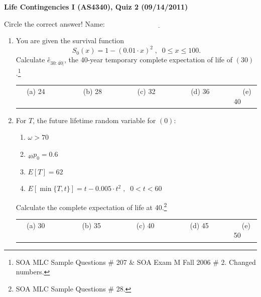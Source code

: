 \documentclass[11pt,fleqn,oneside]{book}
\begin{document}
\thispagestyle{empty}
\setcounter{page}{1}
\begin{center}
{ \large \bf Life Contingencies I (AS4340), Quiz 2 (09/14/2011)}
\end{center}
\noindent
Circle the correct answer! Name: $\underline{\;\;\;\;\;\;\;\;\;\;\;\;\;\;\;\;\;\;\;\;\;\;\;\;\;\;\;\;\;\;\;\;\;\;\;\;\;\;\;\;\;\;\;\;\;\;\;\;\;\;\;\;\;}$
\begin{enumerate}
\item
You are given the survival function
$$
S_0(x) = 1 - (0.01\cdot x)^2\;,\;\;0\leq x \leq 100.
$$
Calculate $\stackrel{\circ}{e}_{30:\overline{40}|}$, the 40-year temporary complete expectation of life of 
$(30)$.\footnote[1]{SOA MLC Sample Questions \# 207 \& SOA Exam M Fall 2006 \# 2. Changed numbers.}

\vspace{0.35cm}
\small
\begin{center}
\begin{tabular}{c c c c c}
(a) 24$\;\;\;\;\;\;\;\;\;\;$ & 
$\;\;\;\;\;\;\;\;\;\;$(b) 28$\;\;\;\;\;\;\;\;\;\;$ & 
$\;\;\;\;\;\;\;\;\;\;$(c) 32$\;\;\;\;\;\;\;\;\;\;$ &
$\;\;\;\;\;\;\;\;\;\;$(d) 36$\;\;\;\;\;\;\;\;\;\;$ &
$\;\;\;\;\;\;\;\;\;\;$(e) 40
\end{tabular}
\end{center}
\vspace{0.2cm}

\normalsize
\item For $T$, the future lifetime random variable for $(0)$:
\begin{enumerate}
\item $\omega > 70$
\item ${_{40}p_0} = 0.6$
\item $E[T] = 62$
\item $E[\min\{T,t\}] = t - 0.005\cdot t^2\;,\;\;0<t<60$
\end{enumerate}
Calculate the complete expectation of life at 40.\footnote[2]{SOA MLC Sample Questions \# 28.}

\vspace{0.35cm}
\small
\begin{center}
\begin{tabular}{c c c c c}
(a) 30$\;\;\;\;\;\;\;\;\;$ & 
$\;\;\;\;\;\;\;\;\;$(b) 35$\;\;\;\;\;\;\;\;\;$ & 
$\;\;\;\;\;\;\;\;\;$(c) 40$\;\;\;\;\;\;\;\;\;$ &
$\;\;\;\;\;\;\;\;\;$(d) 45$\;\;\;\;\;\;\;\;\;$ &
$\;\;\;\;\;\;\;\;\;$(e) 50
\end{tabular}
\end{center}
\vspace{0.2cm}


\end{enumerate}
\end{document}
